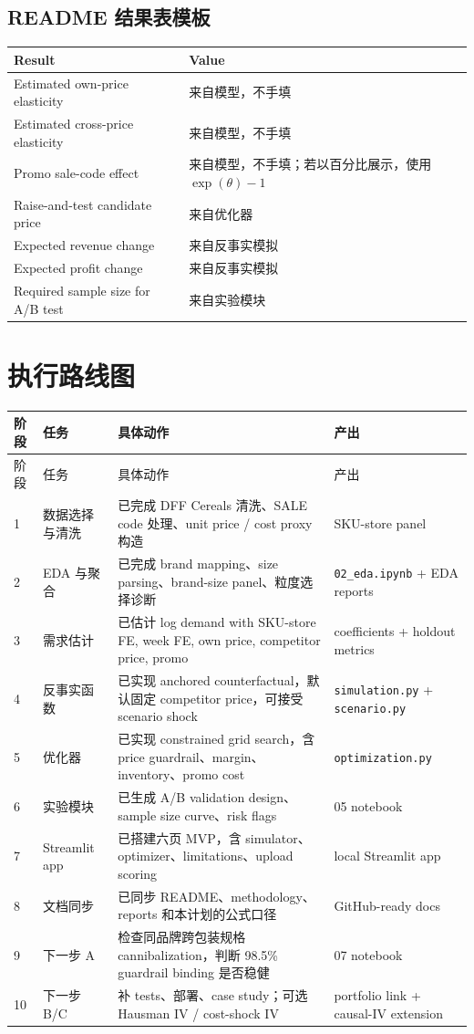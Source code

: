 \documentclass[UTF8,11pt,a4paper,fontset=none]{ctexart}
\begin{document}
\subsection{README 结果表模板}

\begin{tabularx}{\textwidth}{L{5.0cm}Y}
\toprule
Result & Value \\
\midrule
Estimated own-price elasticity & 来自模型，不手填 \\
Estimated cross-price elasticity & 来自模型，不手填 \\
Promo sale-code effect & 来自模型，不手填；若以百分比展示，使用 $\exp(\theta)-1$ \\
Raise-and-test candidate price & 来自优化器 \\
Expected revenue change & 来自反事实模拟 \\
Expected profit change & 来自反事实模拟 \\
Required sample size for A/B test & 来自实验模块 \\
\bottomrule
\end{tabularx}

\newpage
\section{执行路线图}

\small
\begin{longtable}{C{1.1cm}L{2.8cm}L{7.0cm}L{3.2cm}}
\toprule
阶段 & 任务 & 具体动作 & 产出 \\
\midrule
\endfirsthead
\toprule
阶段 & 任务 & 具体动作 & 产出 \\
\midrule
{} & 数据选择与清洗 & 已完成 DFF Cereals 清洗、SALE code 处理、unit price / cost proxy 构造 & SKU-store panel \\
2 & EDA 与聚合 & 已完成 brand mapping、size parsing、brand-size panel、粒度选择诊断 & \texttt{02\_eda.ipynb} + EDA reports \\
3 & 需求估计 & 已估计 log demand with SKU-store FE, week FE, own price, competitor price, promo & coefficients + holdout metrics \\
4 & 反事实函数 & 已实现 anchored counterfactual，默认固定 competitor price，可接受 scenario shock & \texttt{simulation.py} + \texttt{scenario.py} \\
5 & 优化器 & 已实现 constrained grid search，含 price guardrail、margin、inventory、promo cost & \texttt{optimization.py} \\
6 & 实验模块 & 已生成 A/B validation design、sample size curve、risk flags & 05 notebook \\
7 & Streamlit app & 已搭建六页 MVP，含 simulator、optimizer、limitations、upload scoring & local Streamlit app \\
8 & 文档同步 & 已同步 README、methodology、reports 和本计划的公式口径 & GitHub-ready docs \\
9 & 下一步 A & 检查同品牌跨包装规格 cannibalization，判断 98.5\% guardrail binding 是否稳健 & 07 notebook \\
10 & 下一步 B/C & 补 tests、部署、case study；可选 Hausman IV / cost-shock IV & portfolio link + causal-IV extension \\
\bottomrule
\end{longtable}
\normalsize
\end{document}
